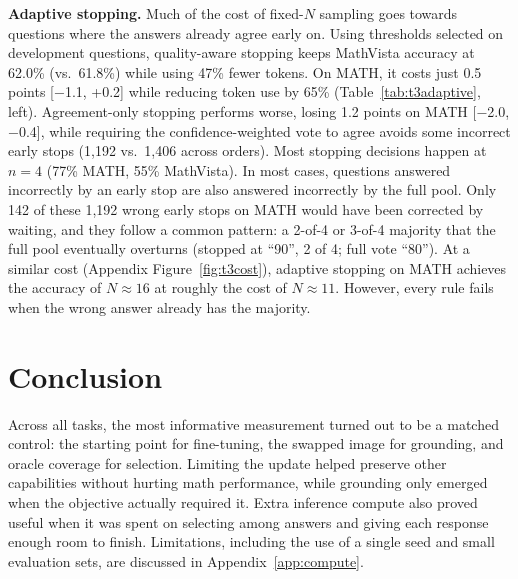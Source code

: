 \documentclass{article}
\begin{document}
\textbf{Adaptive stopping.} Much of the cost of fixed-$N$ sampling goes towards questions where the answers already agree early on. Using thresholds selected on development questions, quality-aware stopping keeps MathVista accuracy at 62.0\% (vs.\ 61.8\%) while using 47\% fewer tokens. On MATH, it costs just 0.5 points [$-$1.1, +0.2] while reducing token use by 65\% (Table~\ref{tab:t3adaptive}, left). Agreement-only stopping performs worse, losing 1.2 points on MATH [$-$2.0, $-$0.4], while requiring the confidence-weighted vote to agree avoids some incorrect early stops (1,192 vs.\ 1,406 across orders). Most stopping decisions happen at $n{=}4$ (77\% MATH, 55\% MathVista). In most cases, questions answered incorrectly by an early stop are also answered incorrectly by the full pool. Only 142 of these 1,192 wrong early stops on MATH would have been corrected by waiting, and they follow a common pattern: a 2-of-4 or 3-of-4 majority that the full pool eventually overturns (stopped at ``90'', 2 of 4; full vote ``80''). At a similar cost (Appendix Figure~\ref{fig:t3cost}), adaptive stopping on MATH achieves the accuracy of $N{\approx}16$ at roughly the cost of $N{\approx}11$. However, every rule fails when the wrong answer already has the majority.


\section{Conclusion}


Across all tasks, the most informative measurement turned out to be a matched control: the starting point for fine-tuning, the swapped image for grounding, and oracle coverage for selection. Limiting the update helped preserve other capabilities without hurting math performance, while grounding only emerged when the objective actually required it. Extra inference compute also proved useful when it was spent on selecting among answers and giving each response enough room to finish. Limitations, including the use of a single seed and small evaluation sets, are discussed in Appendix~\ref{app:compute}.
\end{document}
